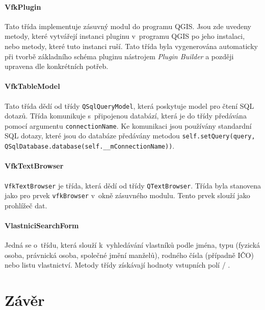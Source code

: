\documentclass[a4paper,12pt,oneside]{book}
\begin{document}
\subsubsection{VfkPlugin}
Tato třída implementuje zásuvný modul do programu QGIS. Jsou zde uvedeny metody, které vytvářejí instanci pluginu v~programu QGIS po jeho instalaci, nebo metody, které tuto instanci ruší. Tato třída byla vygenerována automaticky při tvorbě základního schéma pluginu nástrojem \textit{Plugin Builder} a později upravena dle konkrétních potřeb.

\subsubsection{VfkTableModel}
Tato třída dědí od třídy \texttt{QSqlQueryModel}, která poskytuje model pro čtení SQL dotazů. Třída komunikuje s~připojenou databází, která je do třídy předávána pomocí argumentu \texttt{connectionName}. Ke komunikaci jsou používány standardní SQL dotazy, které jsou do databáze předávány metodou \texttt{self.setQuery(query, QSqlDatabase.database(self.\_\_mConnectionName))}.

\subsubsection{VfkTextBrowser}
\texttt{VfkTextBrowser} je třída, která dědí od třídy \texttt{QTextBrowser}. Třída byla stanovena jako  pro prvek \texttt{vfkBrowser} v~okně zásuvného modulu. Tento prvek slouží jako prohlížeč dat.

\subsubsection{VlastniciSearchForm}
Jedná se o~třídu, která slouží k~vyhledávání vlastníků podle jména, typu (fyzická osoba, právnická osoba, společné jmění manželů), rodného čísla (případně IČO) nebo listu vlastnictví. Metody třídy získávají hodnoty vstupních polí / .


\clearpage
\chapter*{Závěr}



\clearpage
\rhead{{\rightmark}}	%
\renewcommand{\refname}{Použitá literatura}


\end{document}
